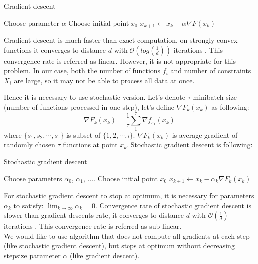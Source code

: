 \documentclass[11pt]{book}
\begin{document}
\begin{algorithm}[H]
	\caption{Gradient descent}
	\label{alg:gd}
	\begin{algorithmic}[1]
		\State Choose parameter $\alpha$
		\State Choose initial point $x_0$
		\State $x_{k+1} \leftarrow x_k - \alpha\nabla F(x_k) $
		\EndFor
	\end{algorithmic}
\end{algorithm}

Gradient descent is much faster than exact computation, on strongly convex functions it converges to distance $d$ with $\mathcal{O}(log(\frac{1}{d}))$ iterations \cite{GD} . This convergence rate is referred as linear. However, it is not appropriate for this problem. In our case, both the number of functions $f_i$ and number of constraints $X_i$ are large, so it may not be able to process all data at once.

Hence it is necessary to use stochastic version. Let's denote $\tau$ minibatch size (number of functions processed in one step), let's define $\nabla F_k(x_k)$ as following: $$\nabla F_k(x_k) = \frac{1}{\tau}\sum_1^\tau \nabla f_{s_1}(x_k)$$ where $\{s_1, s_2, \cdots, s_\tau\}$ is subset of $\{1,2,\cdots, l \}$. $\nabla F_k(x_k)$ is average gradient of randomly chosen $\tau$ functions at point $x_k$. Stochastic gradient descent is following:

\begin{algorithm}[H]
	\caption{Stochastic gradient descent}
	\label{alg:sgd}
	\begin{algorithmic}[1]
		\State Choose parameters $\alpha_0$, $\alpha_1$, $\dots$.
		\State Choose initial point $x_0$
		\State $x_{k+1} \leftarrow x_k - \alpha_k\nabla F_k(x_k) $
		\EndFor
	\end{algorithmic}
\end{algorithm}

For stochastic gradient descent to stop at optimum, it is necessary for parameters $\alpha_k$ to satisfy: $\lim_{k \rightarrow \infty}\alpha_k=0 $. Convergence rate of stochastic gradient descent is slower than gradient descents rate, it converges to distance $d$ with $\mathcal{O}(\frac{1}{d})$ iterations \cite{SGD}. This convergence rate is referred as sub-linear.\\

We would like to use algorithm that does not compute all gradients at each step (like stochastic gradient descent), but stops at optimum without decreasing stepsize parameter $\alpha$ (like gradient descent).\\
\end{document}
